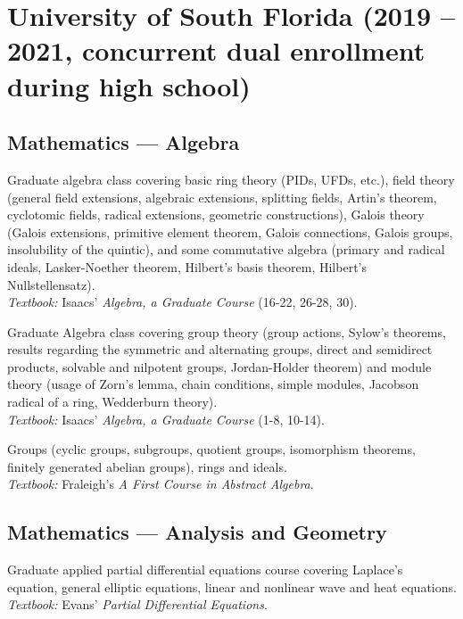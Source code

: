 \documentclass[11pt,letterpaper,sans]{moderncv}
\begin{document}
\section{University of South Florida (2019 -- 2021, concurrent dual enrollment during high school)}


\subsection{Mathematics --- Algebra}

%
  {Graduate algebra class covering basic ring theory (PIDs, UFDs, etc.), field theory (general field extensions, algebraic extensions, splitting fields, Artin's theorem, cyclotomic fields, radical extensions, geometric constructions), Galois theory (Galois extensions, primitive element theorem, Galois connections, Galois groups, insolubility of the quintic), and some commutative algebra (primary and radical ideals, Lasker-Noether theorem, Hilbert's basis theorem, Hilbert's Nullstellensatz).  \\ \emph{Textbook: }Isaacs' \emph{Algebra, a Graduate Course} (16-22, 26-28, 30).}

%
  {Graduate Algebra class covering group theory (group actions, Sylow's theorems, results regarding the symmetric and alternating groups, direct and semidirect products, solvable and nilpotent groups, Jordan-Holder theorem) and module theory (usage of Zorn's lemma, chain conditions, simple modules, Jacobson radical of a ring, Wedderburn theory). \\ \emph{Textbook: }Isaacs' \emph{Algebra, a Graduate Course} (1-8, 10-14).}

%
  {Groups (cyclic groups, subgroups, quotient groups, isomorphism theorems, finitely generated abelian groups), rings and ideals. \\ \emph{Textbook: }Fraleigh's \emph{A First Course in Abstract Algebra}.}



\subsection{Mathematics --- Analysis and Geometry}

%
  {Graduate applied partial differential equations course covering Laplace's equation, general elliptic equations, linear and nonlinear wave and heat equations. \\ \emph{Textbook: }Evans' \emph{Partial Differential Equations}.}
\end{document}
